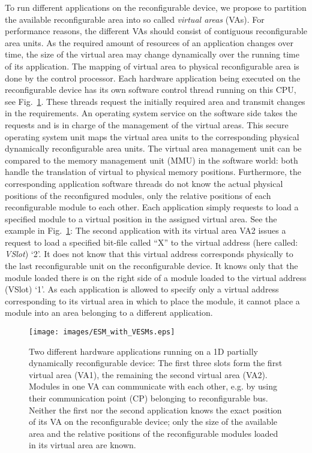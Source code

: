 \documentclass[10pt,journal]{IEEEtran}
\begin{document}
To run different applications on the reconfigurable device,
we propose to partition the available reconfigurable area into so
called {\em virtual areas} (VAs). For performance reasons, the different VAs
should consist of contiguous reconfigurable area units. 
As the required amount of resources of an
application changes over time, the size of the
virtual area may change dynamically over the running time of its
application. The mapping of virtual area to physical reconfigurable
area is done by the control processor. Each hardware application being
executed on the reconfigurable device has its own software control
thread running on this CPU, see Fig.~\ref{fig:esm_with_vesms}. These
threads request the initially required area and transmit
changes in the requirements.
An operating system
service on the software side takes the requests and is in charge of
the management of the virtual areas. This secure operating system unit
maps the virtual area units to the corresponding
physical dynamically reconfigurable area units. The virtual area
management unit can be compared to the memory management unit (MMU) in
the software world: both handle the translation of virtual to physical
memory positions. Furthermore, the corresponding application software
threads do not know the actual physical positions of the reconfigured
modules, only the relative positions of each reconfigurable module
to each other. Each application simply requests to load a specified
module to a virtual position in the assigned virtual area. See the
example in Fig.~\ref{fig:esm_with_vesms}: The second
application with its virtual area VA2 issues a request to load a
specified bit-file called ``X'' to the virtual address (here called:
{\em VSlot}) `2'. It does not know that this virtual address corresponds
physically to the last reconfigurable unit on the reconfigurable
device. It knows only that the module loaded there is on the right
side of a module loaded to the virtual address (VSlot) `1'. As each
application is allowed to specify only a virtual address corresponding
to its virtual area in which to place the module, it cannot place a module
into an area belonging to a different application.

\begin{figure}[t]
        \centering \texttt{[image: images/ESM\_with\_VESMs.eps]}
        \caption{Two different hardware applications running on a 1D
          partially dynamically reconfigurable device: The first three
          slots form the first virtual area (VA1), the remaining the
          second virtual area (VA2). Modules in one VA can communicate
          with each other, e.g. by using their communication point
          (CP) belonging to reconfigurable bus. Neither the first nor
          the second application knows the exact position of its VA on
          the reconfigurable device; only the size of the available
          area and the relative positions of the reconfigurable
          modules loaded in its virtual area are
          known.} \label{fig:esm_with_vesms}
\end{figure}
\end{document}

